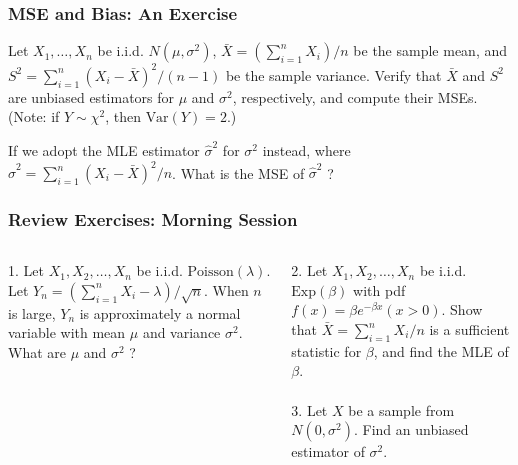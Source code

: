 \documentclass{beamer}
\begin{document}
\begin{frame}
\frametitle{MSE and Bias: An Exercise}
Let $X_1,\ldots,X_n$ be i.i.d. $N(\mu,\sigma^2)$, $\bar{X}=(\sum_{i=1}^n X_i)/n$ be the sample mean, and $S^2=\sum_{i=1}^n (X_i-\bar{X})^2/(n-1)$ be the sample variance. Verify that $\bar{X}$ and $S^2$ are unbiased estimators for $\mu$ and $\sigma^2$, respectively, and compute their MSEs.\\
(Note: if $Y \sim \chi^2$, then $\text{Var}(Y)=2$.)
\vspace*{0.6in}

If we adopt the MLE estimator $\hat{\sigma}^2$ for $\sigma^2$ instead, where $\hat{\sigma}^2=\sum_{i=1}^n (X_i-\bar{X})^2/n$. What is the MSE of $\hat{\sigma}^2$ ?
\vspace*{0.6in}
\end{frame}


\begin{frame}
\frametitle{Review Exercises: Morning Session}
\begin{columns}[t]
1. Let $X_1,X_2,\ldots,X_n$ be i.i.d. $\text{Poisson}(\lambda)$. Let $Y_n = (\sum_{i=1}^n X_i - \lambda)/\sqrt{n}$. When $n$ is large, $Y_n$ is approximately a normal variable with mean $\mu$ and variance $\sigma^2$. What are $\mu$ and $\sigma^2$ ?

2. Let $X_1,X_2,\ldots,X_n$ be i.i.d. $\text{Exp}(\beta)$ with pdf $f(x)=\beta e^{-\beta x} (x > 0)$. Show that $\bar{X} = \sum_{i=1}^n X_i/n$ is a sufficient statistic for $\beta$, and find the MLE of $\beta$.
\\~\\
3. Let $X$ be a sample from $N(0,\sigma^2)$. Find an unbiased estimator of $\sigma^2$.

\end{columns}
\end{frame}
\end{document}
